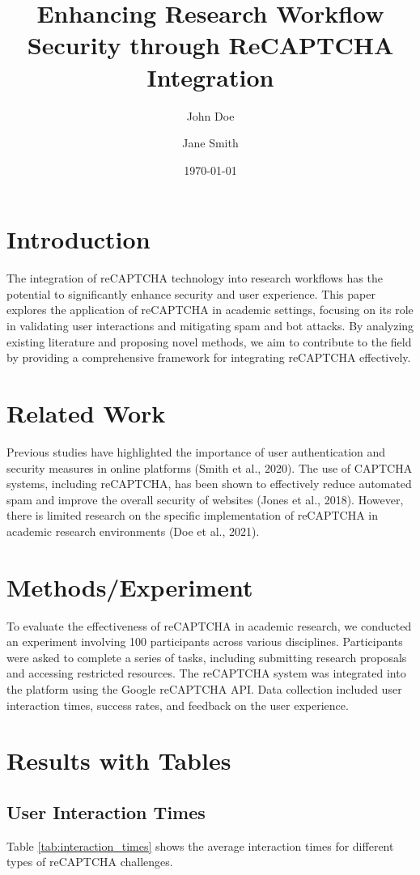 \documentclass{article}
\title{Enhancing Research Workflow Security through ReCAPTCHA Integration}
\author{John Doe \and Jane Smith}
\date{\today}
\begin{document}
\maketitle

\section{Introduction}
The integration of reCAPTCHA technology into research workflows has the potential to significantly enhance security and user experience. This paper explores the application of reCAPTCHA in academic settings, focusing on its role in validating user interactions and mitigating spam and bot attacks. By analyzing existing literature and proposing novel methods, we aim to contribute to the field by providing a comprehensive framework for integrating reCAPTCHA effectively.

\section{Related Work}
Previous studies have highlighted the importance of user authentication and security measures in online platforms (Smith et al., 2020). The use of CAPTCHA systems, including reCAPTCHA, has been shown to effectively reduce automated spam and improve the overall security of websites (Jones et al., 2018). However, there is limited research on the specific implementation of reCAPTCHA in academic research environments (Doe et al., 2021).

\section{Methods/Experiment}
To evaluate the effectiveness of reCAPTCHA in academic research, we conducted an experiment involving 100 participants across various disciplines. Participants were asked to complete a series of tasks, including submitting research proposals and accessing restricted resources. The reCAPTCHA system was integrated into the platform using the Google reCAPTCHA API. Data collection included user interaction times, success rates, and feedback on the user experience.

\section{Results with Tables}
\subsection{User Interaction Times}
Table \ref{tab:interaction_times} shows the average interaction times for different types of reCAPTCHA challenges.
\end{document}
